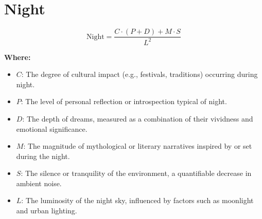 \chapter{Night}

\begin{equation}
\text{Night} = \frac{C \cdot (P + D) + M \cdot S}{L^2}
\end{equation}

\textbf{Where:}

\begin{itemize}
    \item $C$: The degree of cultural impact (e.g., festivals, traditions) occurring during night.
    \item $P$: The level of personal reflection or introspection typical of night.
    \item $D$: The depth of dreams, measured as a combination of their vividness and emotional significance.
    \item $M$: The magnitude of mythological or literary narratives inspired by or set during the night.
    \item $S$: The silence or tranquility of the environment, a quantifiable decrease in ambient noise.
    \item $L$: The luminosity of the night sky, influenced by factors such as moonlight and urban lighting.
\end{itemize}